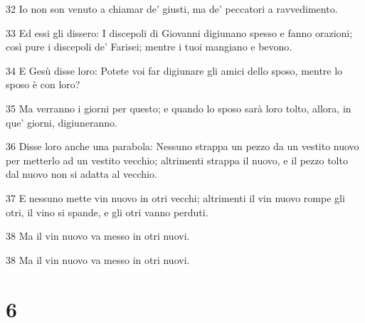 \par 32 Io non son venuto a chiamar de' giusti, ma de' peccatori a ravvedimento.
\par 33 Ed essi gli dissero: I discepoli di Giovanni digiunano spesso e fanno orazioni; così pure i discepoli de' Farisei; mentre i tuoi mangiano e bevono.
\par 34 E Gesù disse loro: Potete voi far digiunare gli amici dello sposo, mentre lo sposo è con loro?
\par 35 Ma verranno i giorni per questo; e quando lo sposo sarà loro tolto, allora, in que' giorni, digiuneranno.
\par 36 Disse loro anche una parabola: Nessuno strappa un pezzo da un vestito nuovo per metterlo ad un vestito vecchio; altrimenti strappa il nuovo, e il pezzo tolto dal nuovo non si adatta al vecchio.
\par 37 E nessuno mette vin nuovo in otri vecchi; altrimenti il vin nuovo rompe gli otri, il vino si spande, e gli otri vanno perduti.
\par 38 Ma il vin nuovo va messo in otri nuovi.
\par 38 Ma il vin nuovo va messo in otri nuovi.

\chapter{6}

